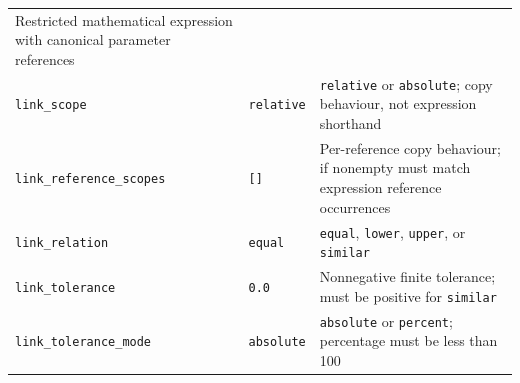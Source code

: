 \documentclass[
  10pt,
  a4paper,
  oneside]{scrreprt}
\begin{document}
\begin{longtable}[]{@{}lll@{}}
\begin{minipage}[t]{0.30\columnwidth}
Restricted mathematical expression with canonical parameter
references\strut
\end{minipage}\tabularnewline
\begin{minipage}[t]{0.30\columnwidth}\raggedright
\texttt{link\_scope}\strut
\end{minipage} & \begin{minipage}[t]{0.30\columnwidth}\raggedright
\texttt{relative}\strut
\end{minipage} & \begin{minipage}[t]{0.30\columnwidth}\raggedright
\texttt{relative} or \texttt{absolute}; copy behaviour, not expression
shorthand\strut
\end{minipage}\tabularnewline
\begin{minipage}[t]{0.30\columnwidth}\raggedright
\texttt{link\_reference\_scopes}\strut
\end{minipage} & \begin{minipage}[t]{0.30\columnwidth}\raggedright
\texttt{{[}{]}}\strut
\end{minipage} & \begin{minipage}[t]{0.30\columnwidth}\raggedright
Per-reference copy behaviour; if nonempty must match expression
reference occurrences\strut
\end{minipage}\tabularnewline
\begin{minipage}[t]{0.30\columnwidth}\raggedright
\texttt{link\_relation}\strut
\end{minipage} & \begin{minipage}[t]{0.30\columnwidth}\raggedright
\texttt{equal}\strut
\end{minipage} & \begin{minipage}[t]{0.30\columnwidth}\raggedright
\texttt{equal}, \texttt{lower}, \texttt{upper}, or
\texttt{similar}\strut
\end{minipage}\tabularnewline
\begin{minipage}[t]{0.30\columnwidth}\raggedright
\texttt{link\_tolerance}\strut
\end{minipage} & \begin{minipage}[t]{0.30\columnwidth}\raggedright
\texttt{0.0}\strut
\end{minipage} & \begin{minipage}[t]{0.30\columnwidth}\raggedright
Nonnegative finite tolerance; must be positive for
\texttt{similar}\strut
\end{minipage}\tabularnewline
\begin{minipage}[t]{0.30\columnwidth}\raggedright
\texttt{link\_tolerance\_mode}\strut
\end{minipage} & \begin{minipage}[t]{0.30\columnwidth}\raggedright
\texttt{absolute}\strut
\end{minipage} & \begin{minipage}[t]{0.30\columnwidth}\raggedright
\texttt{absolute} or \texttt{percent}; percentage must be less than
100\strut
\end{minipage}\tabularnewline
\bottomrule
\end{longtable}
\end{document}
